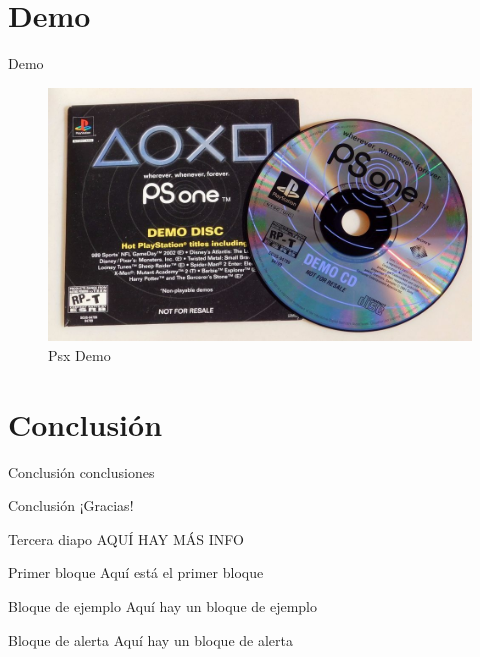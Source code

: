 
\section{Demo}

\begin{frame}{Demo}
    \begin{figure}[H]
        \centering
        \includegraphics[scale=0.2]{presentaciones/img/demopsx.jpg}
        \caption{Psx Demo}
        \label{psx}
    \end{figure}
\end{frame}

\section{Conclusión}

\begin{frame}{Conclusión}
    conclusiones
\end{frame}


\begin{frame}{Conclusión}
    \centering
    \Huge ¡Gracias!
\end{frame}


\begin{frame}{Tercera diapo}
    AQUÍ HAY MÁS INFO
     \begin{block}{Primer bloque}
        Aquí está el primer bloque
    \end{block}
    \begin{exampleblock}{Bloque de ejemplo}
        Aquí hay un bloque de ejemplo
    \end{exampleblock}
    \begin{alertblock}{Bloque de alerta}
        Aquí hay un bloque de alerta
    \end{alertblock}
\end{frame}
